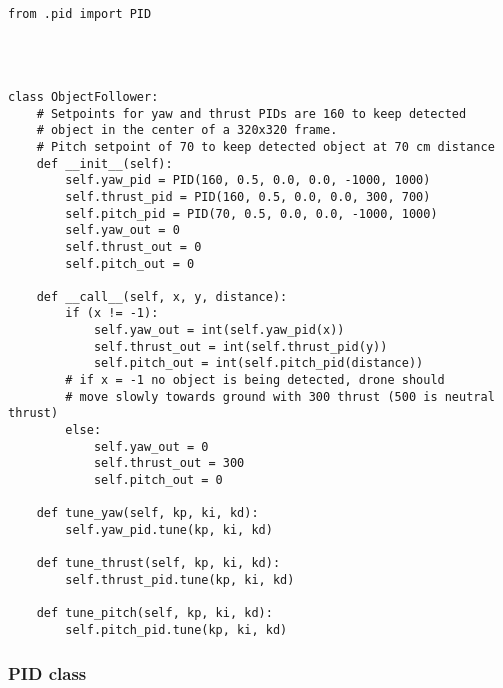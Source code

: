 \begin{lstlisting}[language=PythonPlus, basicstyle=\tiny,]

from .pid import PID




class ObjectFollower:
    # Setpoints for yaw and thrust PIDs are 160 to keep detected
    # object in the center of a 320x320 frame.
    # Pitch setpoint of 70 to keep detected object at 70 cm distance
    def __init__(self):
        self.yaw_pid = PID(160, 0.5, 0.0, 0.0, -1000, 1000)
        self.thrust_pid = PID(160, 0.5, 0.0, 0.0, 300, 700)
        self.pitch_pid = PID(70, 0.5, 0.0, 0.0, -1000, 1000)
        self.yaw_out = 0
        self.thrust_out = 0
        self.pitch_out = 0

    def __call__(self, x, y, distance):
        if (x != -1):
            self.yaw_out = int(self.yaw_pid(x))
            self.thrust_out = int(self.thrust_pid(y))
            self.pitch_out = int(self.pitch_pid(distance))
        # if x = -1 no object is being detected, drone should
        # move slowly towards ground with 300 thrust (500 is neutral thrust)
        else:
            self.yaw_out = 0
            self.thrust_out = 300
            self.pitch_out = 0

    def tune_yaw(self, kp, ki, kd):
        self.yaw_pid.tune(kp, ki, kd)

    def tune_thrust(self, kp, ki, kd):
        self.thrust_pid.tune(kp, ki, kd)

    def tune_pitch(self, kp, ki, kd):
        self.pitch_pid.tune(kp, ki, kd)

\end{lstlisting}

\subsubsection{PID class}

